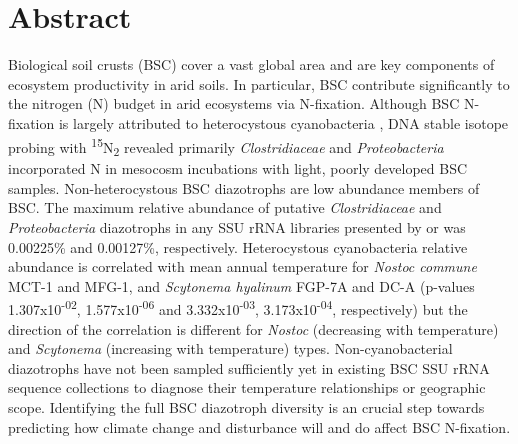 \section{Abstract}
Biological soil crusts (BSC) cover a vast global area and are key components of ecosystem productivity in arid soils. In particular, BSC contribute significantly to the nitrogen (N) budget in arid ecosystems via N-fixation. Although BSC N-fixation is largely attributed to heterocystous cyanobacteria \cite{Yeager, 14766579, Yeager_2012}, DNA stable isotope probing with \textsuperscript{15}N\textsubscript{2} revealed primarily \textit{Clostridiaceae} and \textit{Proteobacteria} incorporated N in mesocosm incubations with light, poorly developed BSC samples. Non-heterocystous BSC diazotrophs are low abundance members of BSC. The maximum relative abundance of putative \textit{Clostridiaceae} and \textit{Proteobacteria} diazotrophs in any SSU rRNA libraries presented by \citet{Garcia_Pichel_2013} or \citet{Steven_2013} was 0.00225\% and 0.00127\%, respectively. Heterocystous cyanobacteria relative abundance is correlated with mean annual temperature for \textit{Nostoc commune} MCT-1 and MFG-1, and \textit{Scytonema hyalinum} FGP-7A and DC-A (p-values 1.307x10\textsuperscript{-02}, 1.577x10\textsuperscript{-06} and 3.332x10\textsuperscript{-03}, 3.173x10\textsuperscript{-04}, respectively) but the direction of the correlation is different for \textit{Nostoc} (decreasing with temperature) and \textit{Scytonema} (increasing with temperature) types. Non-cyanobacterial diazotrophs have not been sampled sufficiently yet in existing BSC SSU rRNA sequence collections to diagnose their temperature relationships or geographic scope. Identifying the full BSC diazotroph diversity is an crucial step towards predicting how climate change and disturbance will and do affect BSC N-fixation.